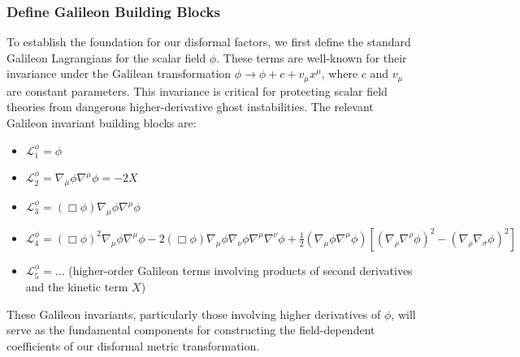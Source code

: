\documentclass[twocolumn]{aastex631}
\begin{document}
\subsubsection{Define Galileon Building Blocks}
To establish the foundation for our disformal factors, we first define the standard Galileon Lagrangians for the scalar field $\phi$. These terms are well-known for their invariance under the Galilean transformation $\phi \rightarrow \phi + c + v_\mu x^\mu$, where $c$ and $v_\mu$ are constant parameters. This invariance is critical for protecting scalar field theories from dangerous higher-derivative ghost instabilities. The relevant Galileon invariant building blocks are:
\begin{itemize}
    \item $\mathcal{L}_1^\phi = \phi$
    \item $\mathcal{L}_2^\phi = \nabla_\mu \phi \nabla^\mu \phi = -2X$
    \item $\mathcal{L}_3^\phi = (\Box \phi) \nabla_\mu \phi \nabla^\mu \phi$
    \item $\mathcal{L}_4^\phi = (\Box\phi)^2 \nabla_\mu \phi \nabla^\mu \phi - 2(\Box\phi) \nabla_\mu \phi \nabla_\nu \phi \nabla^\mu \nabla^\nu \phi + \frac{1}{2} (\nabla_\mu \phi \nabla^\mu \phi) [(\nabla_\rho \nabla^\rho \phi)^2 - (\nabla_\rho \nabla_\sigma \phi)^2]$
    \item $\mathcal{L}_5^\phi = ...$ (higher-order Galileon terms involving products of second derivatives and the kinetic term $X$)
\end{itemize}
These Galileon invariants, particularly those involving higher derivatives of $\phi$, will serve as the fundamental components for constructing the field-dependent coefficients of our disformal metric transformation.
\end{document}
